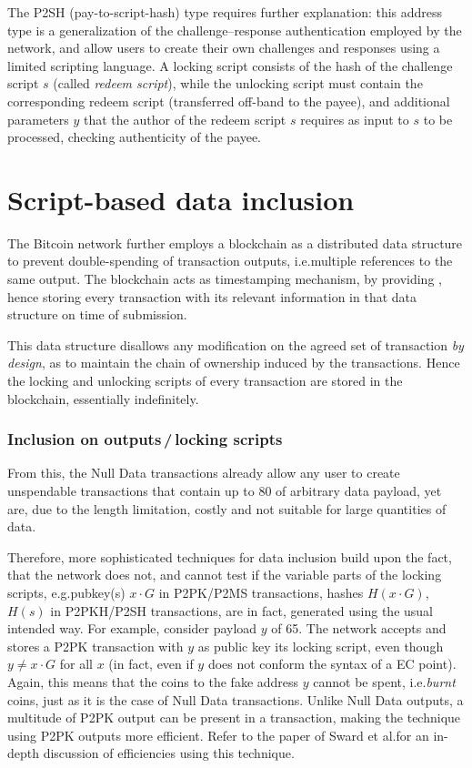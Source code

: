 \documentclass[a4paper,11pt,titlepage]{scrbook}
\begin{document}
The P2SH (pay-to-script-hash) type requires further explanation: this address type is a generalization of the challenge–response authentication employed by the network, and allow users to create their own challenges and responses using a limited scripting language.
A locking script consists of the hash of the challenge script $s$ (called \emph{redeem script}), while the unlocking script must contain the corresponding redeem script (transferred off-band to the payee), and additional parameters $y$ that the author of the redeem script $s$ requires as input to $s$ to be processed, checking authenticity of the payee.




\section{Script-based data inclusion}

The Bitcoin network further employs a blockchain as a distributed data structure to prevent double-spending of transaction outputs, i.e.\@ multiple references to the same output.
The blockchain acts as timestamping mechanism, by providing , hence storing every transaction with its relevant information in that data structure on time of submission.

This data structure disallows any modification on the agreed set of transaction \emph{by design}, 
as to maintain the chain of ownership induced by the transactions.
Hence the locking and unlocking scripts of every transaction are stored in the blockchain, essentially indefinitely.

\subsubsection*{Inclusion on outputs\,/\,locking scripts}

From this, the Null Data transactions already allow any user to create unspendable transactions that contain up to \SI{80}{\byte} of arbitrary data payload, yet are, due to the length limitation, costly and not suitable for large quantities of data.

Therefore, more sophisticated techniques for data inclusion build upon the fact, that the network does not, and cannot test if the variable parts of the locking scripts, e.g.\@ pubkey(s) $x\cdot G$ in P2PK/P2MS transactions, hashes $H(x\cdot G)$, $H(s)$ in P2PKH/P2SH transactions, are in fact, generated using the usual intended way.
For example, consider payload $y$ of \SI{65}{\byte}.
The network accepts and stores a P2PK transaction with $y$ as  public key its locking script, even though $y\neq x\cdot G$ for all $x$ (in fact, even if $y$ does not conform the syntax of a EC point).
Again, this means that the coins  to the fake address $y$ cannot be spent, i.e.\@ \emph{burnt} coins, just as it is the case of Null Data transactions.
Unlike Null Data outputs, a multitude of P2PK output can be present in a transaction, making the technique using P2PK outputs more efficient.
Refer to the paper of Sward et al.\@ for an in-depth discussion of efficiencies using this technique.
\end{document}
